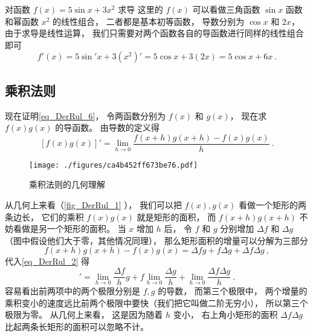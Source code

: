 \begin{example}{对函数 $f(x) = 5\sin x + 3x^2$ 求导}
这里的 $f(x)$ 可以看做三角函数 $\sin x$ 函数和幂函数 $x^2$ 的线性组合， 二者都是基本初等函数， 导数分别为 $\cos x$ 和 $2x$， 由于求导是线性运算， 我们只需要对两个函数各自的导函数进行同样的线性组合即可
\begin{equation}
f'(x) = 5 \sin' x + 3(x^2)' = 5 \cos x + 3(2x) = 5\cos x + 6x~.
\end{equation}
\end{example}

\subsection{乘积法则}
现在证明\autoref{eq_DerRul_6}， 令两函数分别为 $f(x)$ 和 $g(x)$， 现在求 $f(x) g(x)$ 的导函数。 由导数的定义得
\begin{equation}\label{eq_DerRul_2}
[f(x)g(x)]' = \lim_{h\to 0} \frac{f(x+h)g(x+h) - f(x)g(x)}{h}~.
\end{equation}

\begin{figure}[ht]
\centering
\texttt{[image: ./figures/ca4b452ff673be76.pdf]}
\caption{乘积法则的几何理解} \label{fig_DerRul_1}
\end{figure}

从几何上来看（\autoref{fig_DerRul_1} ）， 我们可以把 $f(x), g(x)$ 看做一个矩形的两条边长， 它们的乘积 $f(x)g(x)$ 就是矩形的面积， 而 $f(x+h)g(x+h)$ 不妨看做是另一个矩形的面积。 当 $x$ 增加 $h$ 后， 令 $f$ 和 $g$ 分别增加 $\Delta f$ 和 $\Delta g$ （图中假设他们大于零，其他情况同理）， 那么矩形面积的增量可以分解为三部分
\begin{equation}
f(x+h)g(x+h) - f(x)g(x) = \Delta f g + f \Delta g + \Delta f\Delta g~,
\end{equation}
代入\autoref{eq_DerRul_2} 得
\begin{equation}
[f(x)g(x)]' = \lim_{h\to 0} \frac{\Delta f}{h} g + f \lim_{h\to 0} \frac{\Delta g}{h} + \lim_{h\to 0}\frac{\Delta f\Delta g}{h}~.
\end{equation}
容易看出前两项中的两个极限分别是 $f,g$ 的导数， 而第三个极限中， 两个增量的乘积变小的速度远比前两个极限中要快（我们把它叫做二阶无穷小）， 所以第三个极限为零。 从几何上来看， 这是因为随着 $h$ 变小， 右上角小矩形的面积 $\Delta f\Delta g$ 比起两条长矩形的面积可以忽略不计。

